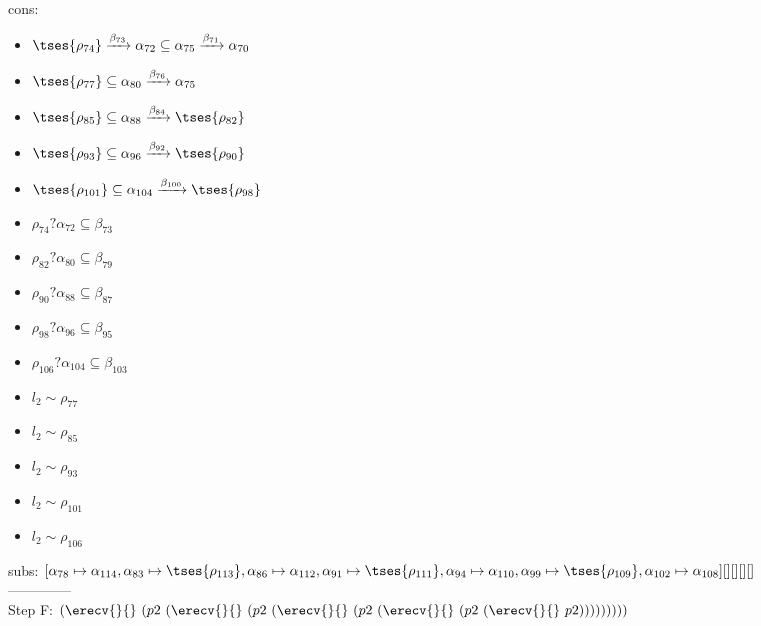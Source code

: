 \documentclass[12pt]{article}
\begin{document}
\\  cons: \begin{itemize}
\item $  \tses{ \rho_{74}} \xrightarrow{\beta_{73}} \alpha_{72} \subseteq \alpha_{75} \xrightarrow{\beta_{71}} \alpha_{70} $
\item $  \tses{ \rho_{77}} \subseteq \alpha_{80} \xrightarrow{\beta_{76}} \alpha_{75} $
\item $  \tses{ \rho_{85}} \subseteq \alpha_{88} \xrightarrow{\beta_{84}}  \tses{ \rho_{82}} $
\item $  \tses{ \rho_{93}} \subseteq \alpha_{96} \xrightarrow{\beta_{92}}  \tses{ \rho_{90}} $
\item $  \tses{ \rho_{101}} \subseteq \alpha_{104} \xrightarrow{\beta_{100}}  \tses{ \rho_{98}} $
\item $ \rho_{74}?\alpha_{72} \subseteq \beta_{73} $
\item $ \rho_{82}?\alpha_{80} \subseteq \beta_{79} $
\item $ \rho_{90}?\alpha_{88} \subseteq \beta_{87} $
\item $ \rho_{98}?\alpha_{96} \subseteq \beta_{95} $
\item $ \rho_{106}?\alpha_{104} \subseteq \beta_{103} $
\item $ l_{2} \sim\rho_{77} $
\item $ l_{2} \sim\rho_{85} $
\item $ l_{2} \sim\rho_{93} $
\item $ l_{2} \sim\rho_{101} $
\item $ l_{2} \sim\rho_{106} $
\end{itemize} 
  subs:  $ [ \alpha_{78}\mapsto\alpha_{114}, \alpha_{83}\mapsto \tses{ \rho_{113}}, \alpha_{86}\mapsto\alpha_{112}, \alpha_{91}\mapsto \tses{ \rho_{111}}, \alpha_{94}\mapsto\alpha_{110}, \alpha_{99}\mapsto \tses{ \rho_{109}}, \alpha_{102}\mapsto\alpha_{108}] [] [] [] [] $  
 \\--------------\\ 
Step F: $ (\erecv{}{}~(p2~(\erecv{}{}~(p2~(\erecv{}{}~(p2~(\erecv{}{}~(p2~(\erecv{}{}~p2))))))))) $
\end{document}
